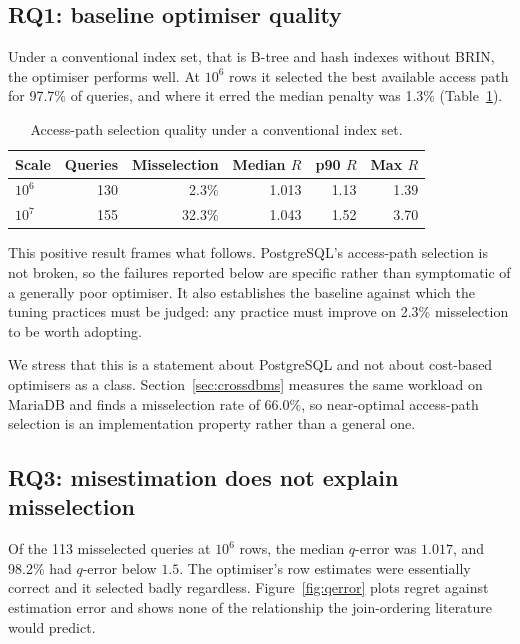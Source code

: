 \documentclass[preprint,12pt,authoryear]{elsarticle}
\begin{document}
\subsection{RQ1: baseline optimiser quality}
\label{sec:baseline}

Under a conventional index set, that is B-tree and hash indexes without
BRIN, the optimiser performs well. At $10^6$ rows it selected the best
available access path for 97.7\% of queries, and where it erred the
median penalty was 1.3\% (Table~\ref{tab:baseline}).

\begin{table}[htbp]
\centering
\caption{Access-path selection quality under a conventional index set.}
\label{tab:baseline}
\small
\begin{tabular}{@{}lrrrrr@{}}
\toprule
Scale & Queries & Misselection & Median $R$ & p90 $R$ & Max $R$ \\
\midrule
$10^6$ & 130 & 2.3\% & 1.013 & 1.13 & 1.39 \\
$10^7$ & 155 & 32.3\% & 1.043 & 1.52 & 3.70 \\
\bottomrule
\end{tabular}
\end{table}

This positive result frames what follows. PostgreSQL's access-path
selection is not broken, so the failures reported below are specific
rather than symptomatic of a generally poor optimiser. It also
establishes the baseline against which the tuning practices must be
judged: any practice must improve on 2.3\% misselection to be worth
adopting.

We stress that this is a statement about PostgreSQL and not about
cost-based optimisers as a class. Section~\ref{sec:crossdbms} measures
the same workload on MariaDB and finds a misselection rate of 66.0\%,
so near-optimal access-path selection is an implementation property
rather than a general one.

\subsection{RQ3: misestimation does not explain misselection}
\label{sec:notest}

Of the 113 misselected queries at $10^6$ rows, the median $q$-error was
$1.017$, and 98.2\% had $q$-error below $1.5$. The optimiser's row
estimates were essentially correct and it selected badly regardless.
Figure~\ref{fig:qerror} plots regret against estimation error and shows
none of the relationship the join-ordering literature would predict.
\end{document}
